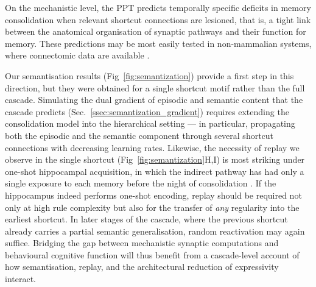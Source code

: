 On the mechanistic level, the PPT predicts temporally specific deficits in memory consolidation when relevant shortcut connections are lesioned, that is, a tight link between the anatomical organisation of synaptic pathways and their function for memory. These predictions may be most easily tested in non-mammalian systems, where connectomic data are available \cite{Xu2020}.

Our semantisation results (Fig~\ref{fig:semantization}) provide a first step in this direction, but they were obtained for a single shortcut motif rather than the full cascade. Simulating the dual gradient of episodic and semantic content that the cascade predicts (Sec.~\ref{ssec:semantization_gradient}) requires extending the consolidation model into the hierarchical setting --- in particular, propagating both the episodic and the semantic component through several shortcut connections with decreasing learning rates. Likewise, the necessity of replay we observe in the single shortcut (Fig~\ref{fig:semantization}H,I) is most striking under one-shot hippocampal acquisition, in which the indirect pathway has had only a single exposure to each memory before the night of consolidation \cite{Lee2015}. If the hippocampus indeed performs one-shot encoding, replay should be required not only at high rule complexity but also for the transfer of \emph{any} regularity into the earliest shortcut. In later stages of the cascade, where the previous shortcut already carries a partial semantic generalisation, random reactivation may again suffice. Bridging the gap between mechanistic synaptic computations and behavioural cognitive function will thus benefit from a cascade-level account of how semantisation, replay, and the architectural reduction of expressivity interact.
